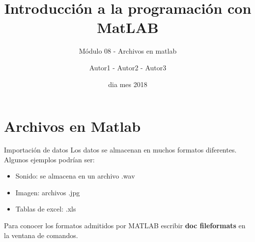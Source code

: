 \documentclass{bredelebeamer}
\title[Programación en MatLAB]{Introducción a la programación con MatLAB}
\subtitle{Módulo 08 - Archivos en matlab}
\author{Autor1 - Autor2 - Autor3\inst{1}}
\institute[UTN.BA]
{
  \inst{1}%
  Universidad Tecnológica Nacional\\
  Facultad Regional Buenos Aires
  }
\date{dia mes 2018}
\begin{document}
\begin{frame}
  \titlepage 
\end{frame}



\section{Archivos en Matlab}

\begin{frame}{Importación de datos}
Los datos se almacenan en muchos formatos diferentes. Algunos ejemplos podrían ser:
\begin{itemize}
\item Sonido: se almacena en un archivo .wav
\item Imagen: archivos .jpg
\item Tablas de excel: .xls
\end{itemize}
Para conocer los formatos admitidos por MATLAB escribir \textbf{doc fileformats} en la ventana de comandos.
\end{frame}
\end{document}
